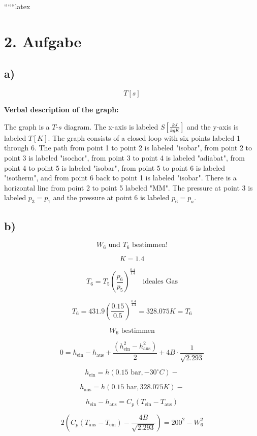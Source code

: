 
``````latex


\section*{2. Aufgabe}

\subsection*{a)}

\[
T[s]
\]

\textbf{Verbal description of the graph:}

The graph is a $T$-$s$ diagram. The x-axis is labeled $S \left[\frac{kJ}{kgK}\right]$ and the y-axis is labeled $T[K]$. The graph consists of a closed loop with six points labeled 1 through 6. The path from point 1 to point 2 is labeled "isobar", from point 2 to point 3 is labeled "isochor", from point 3 to point 4 is labeled "adiabat", from point 4 to point 5 is labeled "isobar", from point 5 to point 6 is labeled "isotherm", and from point 6 back to point 1 is labeled "isobar". There is a horizontal line from point 2 to point 5 labeled "MM". The pressure at point 3 is labeled $p_3 = p_1$ and the pressure at point 6 is labeled $p_6 = p_a$.

\subsection*{b)}

\[
W_6 \text{ und } T_6 \text{ bestimmen!}
\]

\[
K = 1.4
\]

\[
T_6 = T_5 \left( \frac{p_6}{p_5} \right)^{\frac{0.4}{1.4}} \quad \text{ideales Gas}
\]

\[
T_6 = 431.9 \left( \frac{0.15}{0.5} \right)^{\frac{0.4}{1.4}} = \boxed{328.075 K} = T_6
\]

\[
W_6 \text{ bestimmen}
\]

\[
0 = h_{\text{ein}} - h_{\text{aus}} + \frac{(h_{\text{ein}}^2 - h_{\text{aus}}^2)}{2} + 4B \cdot \frac{1}{\sqrt{2.293}}
\]


\[
h_{\text{ein}} = h(0.15 \text{ bar}, -30^\circ C) -
\]

\[
h_{\text{aus}} = h(0.15 \text{ bar}, 328.075 K) -
\]

\[
h_{\text{ein}} - h_{\text{aus}} = C_p (T_{\text{ein}} - T_{\text{aus}})
\]

\[
2 \left( C_p (T_{\text{aus}} - T_{\text{ein}}) - \frac{4B}{\sqrt{2.293}} \right) = 200^2 - W_6^2
\]

